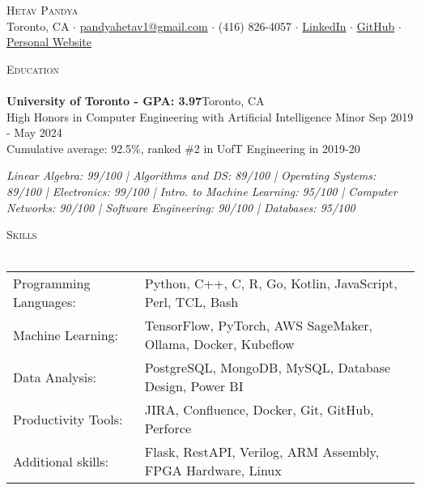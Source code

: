 \documentclass[a4paper]{article}
\newcommand{\lineunder} {
    \vspace*{-8pt} \\
    \hspace*{-18pt} \hrulefill \\
}
\newcommand{\header} [1] {
    {\hspace*{-18pt}\vspace*{6pt} \textsc{#1}}
    \vspace*{-6pt} \lineunder
}
\begin{document}
\vspace*{-40pt}



\vspace*{-10pt}
\begin{center}
	{\Huge \scshape {Hetav Pandya}}\\
	Toronto, CA $\cdot$ \href{mailto:pandyahetav1@gmail.com}{pandyahetav1@gmail.com} $\cdot$ (416) 826-4057 $\cdot$ \href{https://www.linkedin.com/in/hetav-pandya}{LinkedIn} $\cdot$ \href{https://github.com/pandyah5}{GitHub} $\cdot$ \href{https://pandyah5.github.io/terminalresume.github.io/}{Personal Website}\\
\end{center}

\header{Education}
\textbf{University of Toronto - GPA: 3.97}\hfill Toronto, CA\\
High Honors in Computer Engineering with Artificial Intelligence Minor \hfill Sep 2019 - May 2024\\
Cumulative average: 92.5\%, ranked \#2 in UofT Engineering in 2019-20
\linebreak\\
\begin{footnotesize}
\textit{Linear Algebra: 99/100 | Algorithms and DS: 89/100 | Operating Systems: 89/100 | Electronics: 99/100 | 
 Intro. to Machine Learning: 95/100 | Computer Networks: 90/100 | Software Engineering: 90/100 | Databases: 95/100}
\end{footnotesize}
\vspace{2mm}

\header{Skills}
\begin{tabular}{ l l }
	Programming Languages: & Python, C++, C, R, Go, Kotlin, JavaScript, Perl, TCL, Bash             \\
	Machine Learning:      & TensorFlow, PyTorch, AWS SageMaker, Ollama, Docker, Kubeflow             \\
	Data Analysis:         & PostgreSQL, MongoDB, MySQL, Database Design, Power BI            \\
	Productivity Tools:    & JIRA, Confluence, Docker, Git, GitHub, Perforce           \\
    Additional skills:     & Flask, RestAPI, Verilog, ARM Assembly, FPGA Hardware, Linux                      \\                               
\end{tabular}
\vspace{2mm}
\end{document}
